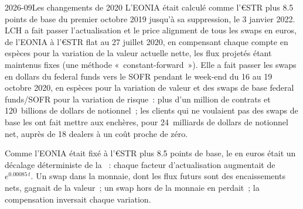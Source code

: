 \begin{dated}{2026-09}{Les changements de 2020}\label{dat:rc:multi-curve-and-collateral-discounting:switches}
L'EONIA était calculé comme l'€STR plus 8.5 points de base du premier octobre 2019 jusqu'à sa
suppression, le 3 janvier 2022. LCH a fait passer l'actualisation et le price alignment
de tous les swaps en euros, de l'EONIA à l'€STR flat au 27 juillet 2020, en compensant chaque
compte en espèces pour la variation de la valeur actuelle nette, les flux projetés étant
maintenus fixes (une méthode «~constant-forward~»). Elle a fait passer les swaps en dollars du federal
funds vers le SOFR pendant le week-end du 16 au 19 octobre 2020, en espèces pour la variation
de valeur et des swaps de base federal funds/SOFR pour la variation de risque~: plus
d'un million de contrats et 120~billions de dollars de notionnel~; les clients qui ne voulaient pas
des swaps de base les ont fait mettre aux enchères, pour 24~milliards de dollars de notionnel net, auprès de 18 dealers
à un coût proche de zéro.
\end{dated}

Comme l'EONIA était fixé à l'€STR plus 8.5 points de base, le  en euros était
un décalage déterministe de la ~: chaque facteur d'actualisation augmentait de
$e^{0.00085\,t}$. Un swap dans la monnaie, dont les flux futurs sont des encaissements nets,
gagnait de la valeur~; un swap hors de la monnaie en perdait~; la compensation
inversait chaque variation.

\label{lst:rc:multi-curve-and-collateral-discounting:switch}

